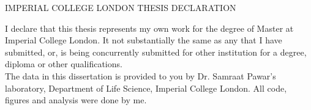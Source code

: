 
\centerline{IMPERIAL COLLEGE LONDON THESIS DECLARATION}
\bigbreak



I declare that this thesis represents my own work for the degree of Master at Imperial College London. It not substantially the same as any that I have submitted, or, is being concurrently submitted for other institution for a degree, diploma or other qualifications. \\

The data in this dissertation is provided to you by Dr. Samraat Pawar's laboratory, Department of Life Science, Imperial College London. All code, figures and analysis were done by me. \\
